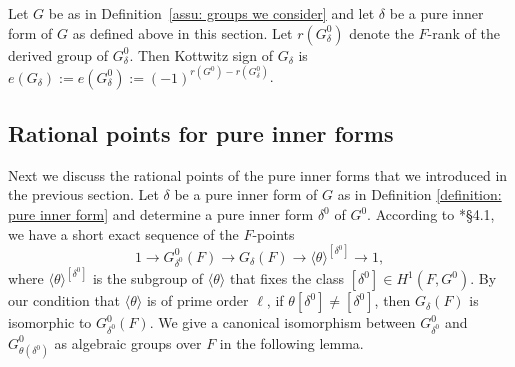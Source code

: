 \documentclass[11pt,letterpaper]{amsart}
\numberwithin{equation}{section}
\begin{document}
\begin{definition}\label{definition: kottwitz sign}
   Let $G$ be as in Definition~\ref{assu: groups we consider} and let $\delta$ be a pure inner form of $G$ as defined above in this section. Let $r(G_\delta^0)$ denote the $F$-rank of the derived group of $G_\delta^0$. Then Kottwitz sign of $G_\delta$ is  $e(G_{\delta}):= e(G_\delta^0):=(-1)^{r(G^0)-r(G_\delta^0)}$. 
\end{definition}





\subsection{Rational points for pure inner forms}\label{subsection: rational points for pure inner forms}
Next we discuss the rational points of the pure inner forms that we introduced in the previous section. 
Let $\delta$ be a pure inner form of $G$ as in Definition \ref{definition: pure inner form} and determine a pure inner form $\delta^0$ of $G^0$. According to 
\cite{Kal26}*{\S 4.1}, we have a short exact sequence of the $F$-points
 \begin{equation}\label{eqn: exact seq pure inner forms first form}
1 \to G^0_{\delta^0}(F) \to G_{\delta}(F) \to \langle \theta \rangle^{[\delta^0]} \to 1,     
 \end{equation}
where $\langle \theta \rangle^{[\delta^0]}$ is the subgroup of $\langle \theta \rangle $ that fixes the class $[\delta^0] \in H^1(F,G^0)$. By our condition that $\langle \theta \rangle $ is of prime order $\ell$, if $\theta[\delta^0] \neq [\delta^0]$, then $G_{\delta}(F)$ is isomorphic to $G^{0}_{\delta^0}(F)$. We give a canonical isomorphism between $G^0_{\delta^0} $ and $G^0_{\theta(\delta^0)}$ as algebraic groups over $F$ in the following lemma.
\end{document}

